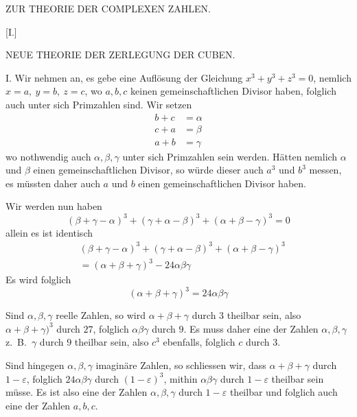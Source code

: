 
%
\clearpage
\renewcommand{\BookRunningTitle}{Zur Theorie der complexen Zahlen}
\begin{center}\Large ZUR THEORIE DER COMPLEXEN ZAHLEN.\end{center}
\begin{center}[I.]\par\medskip\large NEUE THEORIE DER ZERLEGUNG DER CUBEN.\end{center}

I. Wir nehmen an, es gebe eine Auflösung der Gleichung $x^3+y^3+z^3=0$, nemlich $x=a,\ y=b,\ z=c$, wo $a,b,c$ keinen gemeinschaftlichen Divisor haben, folglich auch unter sich Primzahlen sind. Wir setzen
\[
\begin{aligned}
b+c&=\alpha\\
c+a&=\beta\\
a+b&=\gamma
\end{aligned}
\]
wo nothwendig auch $\alpha,\beta,\gamma$ unter sich Primzahlen sein werden. Hätten nemlich $\alpha$ und $\beta$ einen gemeinschaftlichen Divisor, so würde dieser auch $a^3$ und $b^3$ messen, es müssten daher auch $a$ und $b$ einen gemeinschaftlichen Divisor haben.

Wir werden nun haben
\[
(\beta+\gamma-\alpha)^3+(\gamma+\alpha-\beta)^3+(\alpha+\beta-\gamma)^3=0
\]
allein es ist identisch
\[
\begin{aligned}
&(\beta+\gamma-\alpha)^3+(\gamma+\alpha-\beta)^3+(\alpha+\beta-\gamma)^3\\
&=(\alpha+\beta+\gamma)^3-24\alpha\beta\gamma
\end{aligned}
\]
Es wird folglich
\[
(\alpha+\beta+\gamma)^3=24\alpha\beta\gamma
\]

%
Sind $\alpha,\beta,\gamma$ reelle Zahlen, so wird $\alpha+\beta+\gamma$ durch $3$ theilbar sein, also $\alpha+\beta+\gamma)^3$ durch $27$, folglich $\alpha\beta\gamma$ durch $9$. Es muss daher eine der Zahlen $\alpha,\beta,\gamma$ z.\ B.\ $\gamma$ durch $9$ theilbar sein, also $c^3$ ebenfalls, folglich $c$ durch $3$.

Sind hingegen $\alpha,\beta,\gamma$ imaginäre Zahlen, so schliessen wir, dass $\alpha+\beta+\gamma$ durch $1-\varepsilon$, folglich $24\alpha\beta\gamma$ durch $(1-\varepsilon)^3$, mithin $\alpha\beta\gamma$ durch $1-\varepsilon$ theilbar sein müsse. Es ist also eine der Zahlen $\alpha,\beta,\gamma$ durch $1-\varepsilon$ theilbar und folglich auch eine der Zahlen $a,b,c$.

